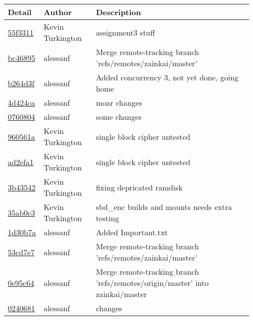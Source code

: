 \begin{tabular}{l l l}\textbf{Detail} & \textbf{Author} & \textbf{Description}\\\hline
\href{https://github.com/zainkai/CS444/commit/55f3311a7874136a1a8823af1951a9ad76e43ba2}{55f3311} & Kevin Turkington & assignment3 stuff\\\hline
\href{https://github.com/zainkai/CS444/commit/bc46895c7f20e41317aca4982660dc4f90487eba}{bc46895} & alessanf & Merge remote-tracking branch 'refs/remotes/zainkai/master'\\\hline
\href{https://github.com/zainkai/CS444/commit/b264d3f48c9cabc69400904cc165390d74d69b6c}{b264d3f} & alessanf & Added concurrency 3, not yet done, going home\\\hline
\href{https://github.com/zainkai/CS444/commit/4d424ca562c2a66e6c48ed010ed0418cd7e30546}{4d424ca} & alessanf & moar changes\\\hline
\href{https://github.com/zainkai/CS444/commit/0760804acf2700b65a34f194019aba221c491f02}{0760804} & alessanf & some changes\\\hline
\href{https://github.com/zainkai/CS444/commit/960561aa7b84201265df2908679e0c97c1ba645d}{960561a} & Kevin Turkington & single block cipher untested\\\hline
\href{https://github.com/zainkai/CS444/commit/ad2efa13d2578b33be8bc69e5e2558e1d0025e50}{ad2efa1} & Kevin Turkington & single block cipher untested\\\hline
\href{https://github.com/zainkai/CS444/commit/3b435423637c5718ddacd858aeea700337e56fd4}{3b43542} & Kevin Turkington & fixing depricated ramdisk\\\hline
\href{https://github.com/zainkai/CS444/commit/35ab0c34409802212937b5326491a68f43ab3edf}{35ab0c3} & Kevin Turkington & sbd\_enc builds and mounts needs extra testing\\\hline
\href{https://github.com/zainkai/CS444/commit/1d30b7afe13f372b6fe1c6077d0561633374e950}{1d30b7a} & alessanf & Added Important.txt\\\hline
\href{https://github.com/zainkai/CS444/commit/53cd7e742a1cd61645237babc430db41392411da}{53cd7e7} & alessanf & Merge remote-tracking branch 'refs/remotes/zainkai/master'\\\hline
\href{https://github.com/zainkai/CS444/commit/0e95c6478aa22a3225d0411eae6bc6d56fd95577}{0e95c64} & alessanf & Merge remote-tracking branch 'refs/remotes/origin/master' into zainkai/master\\\hline
\href{https://github.com/zainkai/CS444/commit/02406815336f99698c8521b3659e7834e0756417}{0240681} & alessanf & changes\\\hline

\end{tabular}
